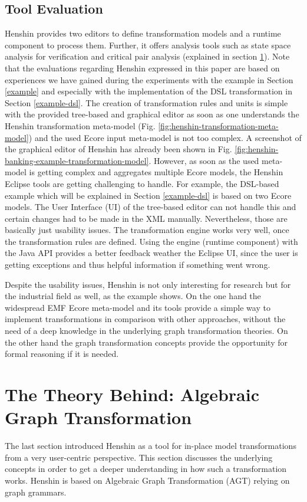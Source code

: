 \documentclass[runningheads]{llncs}
\begin{document}
\subsection{Tool Evaluation}
Henshin provides two editors to define transformation models and a runtime component to process them. Further, it offers analysis tools such as state space analysis for verification and critical pair analysis (explained in section \ref{the-theory}). Note that the evaluations regarding Henshin expressed in this paper are based on experiences we have gained during the experiments with the example in Section \ref{example} and especially with the implementation of the DSL transformation in Section \ref{example-dsl}. The creation of transformation rules and units is simple with the provided tree-based and graphical editor as soon as one understands the Henshin transformation meta-model (Fig. \ref{fig:henshin-transformation-meta-model}) \cite{henshin-transformation-meta-model} and the used Ecore input meta-model is not too complex. A screenshot of the graphical editor of Henshin has already been shown in Fig. \ref{fig:henshin-banking-example-transformation-model}. However, as soon as the used meta-model is getting complex and aggregates multiple Ecore models, the Henshin Eclipse tools are getting challenging to handle. For example, the DSL-based example which will be explained in Section \ref{example-dsl} is based on two Ecore models. The User Interface (UI) of the tree-based editor can not handle this and certain changes had to be made in the XML manually. Nevertheless, those are basically just usability issues. The transformation engine works very well, once the transformation rules are defined. Using the engine (runtime component) with the Java API provides a better feedback weather the Eclipse UI, since the user is getting exceptions and thus helpful information if something went wrong. 

Despite the usability issues, Henshin is not only interesting for research but for the industrial field as well, as the example \cite{10.1007/978-3-642-38883-5_4} shows. On the one hand the widespread EMF Ecore meta-model and its tools provide a simple way to implement transformations in comparison with other approaches, without the need of a deep knowledge in the underlying graph transformation theories. On the other hand the graph transformation concepts provide the opportunity for formal reasoning if it is needed. 

\section{The Theory Behind: Algebraic Graph Transformation}\label{the-theory}
The last section introduced Henshin as a tool for in-place model transformations from a very user-centric perspective. This section discusses the underlying concepts in order to get a deeper understanding in how such a transformation works. Henshin is based on Algebraic Graph Transformation (AGT) \cite{DBLP:series/eatcs/EhrigEPT06} relying on graph grammars.
\end{document}
